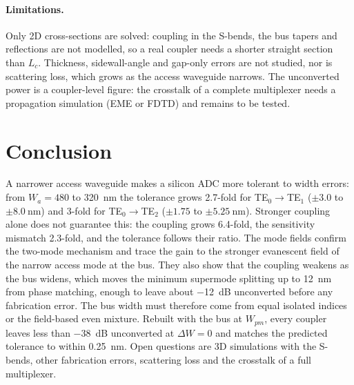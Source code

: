 \documentclass[11pt,a4paper]{article}
\newcommand{\TE}[1]{TE$_{#1}$}
\begin{document}
\paragraph{Limitations.}
Only 2D cross-sections are solved: coupling in the S-bends, the bus tapers and
reflections are not modelled, so a real coupler needs a shorter straight section than
$L_c$. Thickness, sidewall-angle and gap-only errors are not studied, nor is scattering
loss, which grows as the access waveguide narrows. The unconverted power is a
coupler-level figure: the crosstalk of a complete multiplexer needs a propagation
simulation (EME or FDTD) and remains to be tested.

\section{Conclusion}

A narrower access waveguide makes a silicon ADC more tolerant to width errors: from
$W_a = 480$ to \qty{320}{\nm} the tolerance grows 2.7-fold for \TE{0}$\to$\TE{1}
($\pm3.0$ to $\pm\qty{8.0}{\nm}$) and 3-fold for \TE{0}$\to$\TE{2} ($\pm1.75$ to
$\pm\qty{5.25}{\nm}$). Stronger coupling alone does not guarantee this: the coupling grows
6.4-fold, the sensitivity mismatch 2.3-fold, and the tolerance follows their ratio. The
mode fields confirm the two-mode mechanism and trace the gain to the stronger evanescent
field of the narrow access mode at the bus. They also show that the coupling weakens as
the bus widens, which moves the minimum supermode splitting up to \qty{12}{\nm} from
phase matching, enough to leave about \qty{-12}{\dB} unconverted before any
fabrication error. The bus width must therefore come from equal isolated indices or the
field-based even mixture. Rebuilt with the bus at $W_{pm}$, every coupler leaves less than \qty{-38}{\dB}
unconverted at $\Delta W = 0$ and matches the predicted tolerance to within
\qty{0.25}{\nm}. Open questions are 3D simulations with the S-bends, other fabrication
errors, scattering loss and the crosstalk of a full multiplexer.

{\footnotesize


}
\end{document}
